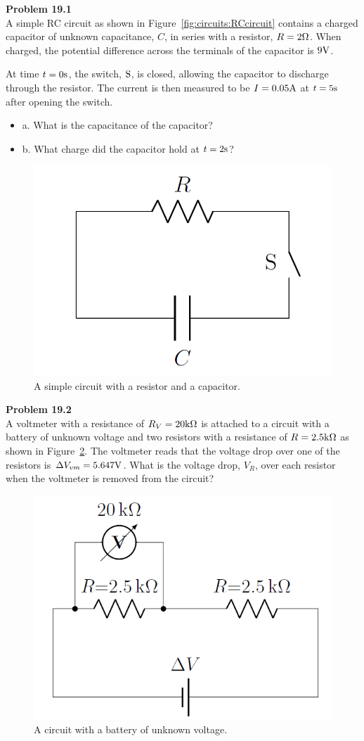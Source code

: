 \begin{framed}
\textbf{Problem 19.1}\\
A simple RC circuit as shown in Figure~\ref{fig:circuits:RCcircuit} contains a charged capacitor of unknown capacitance, $C$, in series with a resistor, $R=2 {\rm \Omega}$. When charged, the potential difference across the terminals of the capacitor is $9 {\rm V}$.

At time $t=0 {\rm s}$, the switch, ${\rm S}$, is closed, allowing the capacitor to discharge through the resistor. The current is then measured to be $I = 0.05 {\rm A}$ at $t = 5 {\rm s}$ after opening the switch.

\begin{itemize}
\item a. What is the capacitance of the capacitor?
\item b. What charge did the capacitor hold at $t = 2 {\rm s}$?
\end{itemize}

\begin{figure}[!htbp]
\centering
\includegraphics[width=0.3\linewidth]{files/RCcircuitCharge-10b05782ac2f5b4511023f1c0ed42294.png}
\caption[]{A simple circuit with a resistor and a capacitor.}
\label{fig:circuits:RCcircuitCharge}
\end{figure}
\end{framed}

\begin{framed}
\textbf{Problem 19.2}\\
A voltmeter with a resistance of $R_V = 20 {\rm k\Omega}$ is attached to a circuit with a battery of unknown voltage and two resistors with a resistance of $R = 2.5 {\rm k\Omega}$ as shown in Figure~\ref{fig:circuits:question2circuit}. The voltmeter reads that the voltage drop over one of the resistors is $\Delta V_{vm} = 5.647 {\rm V}$. What is the voltage drop, $V_R$, over each resistor when the voltmeter is removed from the circuit?

\begin{figure}[!htbp]
\centering
\includegraphics[width=0.45\linewidth]{files/question2circuit-ed8c1860995b2657c9e658d308b1eb62.png}
\caption[]{A circuit with a battery of unknown voltage.}
\label{fig:circuits:question2circuit}
\end{figure}
\end{framed}

